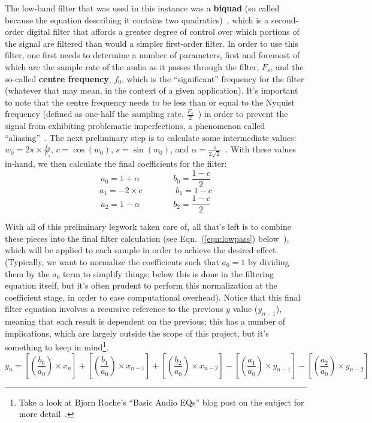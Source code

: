 \documentclass[12pt]{report}
\begin{document}
\indent The low-band filter that was used in this instance was a {\bf biquad} (so called because the equation describing it contains two quadratics)~\cite{Roche2012b}, which is a second-order digital filter that affords a greater degree of control over which portions of the signal are filtered than would a simpler first-order filter. In order to use this filter, one first needs to determine a number of parameters, first and foremost of which are the sample rate of the audio as it passes through the filter, $F_s$, and the so-called {\bf centre frequency}, $f_0$, which is the ``significant'' frequency for the filter (whatever that may mean, in the context of a given application). It's important to note that the centre frequency needs to be less than or equal to the Nyquist frequency (defined as one-half the sampling rate, $\frac{F_s}{2}$~\cite[p.201]{Park2009}) in order to prevent the signal from exhibiting problematic imperfections, a phenomenon called ``aliasing''~\cite{Zawistowski-nd}. The next preliminary step is to calculate some intermediate values: $w_0 = 2 \pi \times \frac{f_0}{F_s}$, $c = \cos(w_0)$, $s = \sin(w_0)$, and $\alpha = \frac{s}{2 \sqrt{2}}$~\cite{BristowJohnson-nd}. With these values in-hand, we then calculate the final coefficients for the filter:
\clearpage
$$a_0 = 1 + \alpha \quad\quad\quad\quad b_0 = \frac{1 - c}{2}$$
$$a_1 = -2 \times c \quad\quad\quad\quad b_1 = 1 - c$$
$$a_2 = 1 - \alpha \quad\quad\quad\quad b_2 = \frac{1 - c}{2}$$

\indent With all of this preliminary legwork taken care of, all that's left is to combine these pieces into the final filter calculation (see Eqn.~(\ref{eqn:lowpass}) below~\cite{BristowJohnson-nd}), which will be applied to each sample in order to achieve the desired effect. (Typically, we want to normalize the coefficients such that $a_0 = 1$ by dividing them by the $a_0$ term to simplify things; below this is done in the filtering equation itself, but it's often prudent to perform this normalization at the coefficient stage, in order to ease computational overhead). Notice that this final filter equation involves a recursive reference to the previous $y$ value ($y_{n-1}$), meaning that each result is dependent on the previous; this has a number of implications, which are largely outside the scope of this project, but it's something to keep in mind\footnote{Take a look at Bjorn Roche's ``Basic Audio EQs'' blog post on the subject for more detail~\cite{Roche2012b}.}.
\begin{equation} 
	\label{eqn:lowpass}
	y_n = [(\frac{b_0}{a_0}) \times x_n] + [(\frac{b_1}{a_0}) \times x_{n-1}] + [(\frac{b_2}{a_0}) \times x_{n-2}] - [(\frac{a_1}{a_0}) \times y_{n-1}] - [(\frac{a_2}{a_0}) \times y_{n-2}]
\end{equation}
\end{document}
